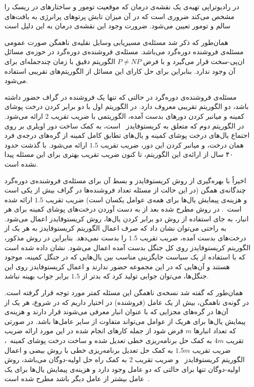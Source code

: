 در رادیوتراپی تهیه‌ی یک نقشه‌ی درمان که موقعیت تومور و ساختارهای در ریسک را مشخص می‌کند ضروری است که در آن میزان تابش پرتوهای پرانرژی به بافت‌های سالم و تومور تعیین می‌شود. ضرورت وجود این نقشه‌ی درمان به این دلیل است  



همان‌طور که ذکر شد مسئله‌ی مسیریابی وسایل نقلیه‌ی ناهمگن صورت عمومی مسئله‌ی فروشنده دوره‌گرد می‌باشد. 
مسئله‌ی فروشنده‌ی دوره‌گرد در حوزه‌ی مسائل ان‌پی-سخت قرار می‌گیرد و با فرض $P \neq NP$ الگوریتم دقیق با زمان چندجمله‌ای برای آن وجود ندارد. بنابراین برای حل کارای این مسائل از الگوریتم‌های تقریبی  استفاده می‌شود.

مسئله‌ی فروشنده‌ی دوره‌گرد در حالتی که تنها یک فروشنده در گراف حضور داشته باشد، دو الگوریتم تقریبی معروف دارد.
در الگوریتم اول با دو برابر کردن درخت پوشای کمینه و میانبر کردن دورهای بدست آمده، الگوریتمی با ضریب تقریب 2 ارائه می‌شود.
در الگوریتم دوم که متعلق به کریستوفایدز~\cite{Christofides} است، به کمک ساخت دور اویلری بر روی اجتماع یال‌های درخت پوشای کمینه و یال‌های تطابق کامل کمینه از گره‌های درجه‌ی فرد همان درخت، و میانبر کردن این دور، ضریب تقریب $1.5$  ارائه می‌شود.
با گذشت حدود ۴۰ سال از ارائه‌ی این الگوریتم، تا کنون 
ضریب تقریب بهتری برای این مسئله پیدا نشده است.

اخیراً با بهره‌گیری از روش کریستوفایدز و بسط آن برای مسئله‌ی فروشنده‌ی دوره‌گرد چندگانه‌ی همگن (در این حالت از مسئله تعداد فروشنده‌ها در گراف بیش از یکی است و هزینه‌ی پیمایش یال‌ها برای همه‌ی عوامل یکسان است) ضریب تقریب $1.5$ ارائه شده است~\cite{Xu}. در روش مطرح شده بعد از به دست آوردن درخت‌های پوشای کمینه برای هر انبار، به جای استفاده از روش دو برابر کردن یال‌ها، روش کریستوفایدز اعمال می‌شود. به راحتی می‌توان نشان داد که صرف اعمال الگوریتم کریستوفایدز به هر یک از درخت‌های بدست آمده، ضریب تقریب  $1.5$ را بدست نمی‌دهد. بنابراین در روش مذکور، الگوریتم کریستوفایدز روی کل جنگل بدست آمده اعمال می‌شود. نشان داده شده است که با استفاده از یک سیاست جایگزینی مناسب بین یال‌هایی که در جنگل کمینه، موجود هستند و آن‌هایی که در این مجموعه حضور ندارند و اعمال کریستوفایدز روی این جنگل‌ها، می‌توان جوابی تولید کرد که بدتر از $1.5$ برابر جواب بهینه نباشد.


همان‌طور که گفته شد نسخه‌ی ناهمگن این مسئله کمتر مورد توجه قرار گرفته است. در گونه‌ی ناهمگن، بیش از یک عامل (فروشنده) در اختیار داریم که در شروع، هر یک از آن‌ها در گره‌های مجزایی که با عنوان انبار معرفی می‌شوند قرار دارند و هزینه‌ی پیمایش یال‌ها برای هریک از عوامل می‌تواند متفاوت از سایر عامل‌ها باشد. در صورتی که تعداد انبارها $m$ فرض شود از جمله کارهای انجام شده در این مورد ارائه ضریب تقریب $4m$ به کمک حل برنامه‌ریزی خطی تعدیل شده  و ساخت درخت پوشای کمینه~\cite{4m}، ضریب تقریب $1.5m$ به کمک حل تعدیل برنامه‌ریزی خطی با روش بیضی و اعمال الگوریتم کریستوفایدز~\cite{1.5m} و ضریب تقریب 2 به کمک راه حل اولیه-دوگان می‌باشد، روش اولیه-دوگان تنها برای حالتی که دو عامل وجود دارد و هزینه‌ی پیمایش یال‌ها برای یک عامل بیشتر از عامل دیگر باشد مطرح شده است~\cite{Primal_Dual}. 


